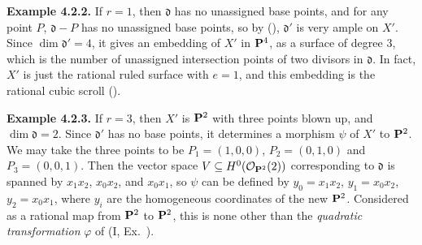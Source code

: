 {\medskip
\noindent\hypertarget{result-V-4.2.2}{}\textbf{Example 4.2.2.} If $r=1$, then $\mathfrak d$ has no unassigned base points, and for any point $P$, $\mathfrak d-P$ has no unassigned base points, so by (), $\mathfrak d'$ is very ample on $X'$. Since $\dim\mathfrak d'=4$, it gives an embedding of $X'$ in $\mathbf{P}^4$, as a surface of degree $3$, which is the number of unassigned intersection points of two divisors in $\mathfrak d$. In fact, $X'$ is just the rational ruled surface with $e=1$, and this embedding is the rational cubic scroll ().

\medskip
\noindent\hypertarget{result-V-4.2.3}{}\textbf{Example 4.2.3.} If $r=3$, then $X'$ is $\mathbf{P}^2$ with three points blown up, and $\dim\mathfrak d=2$. Since $\mathfrak d'$ has no base points, it determines a morphism $\psi$ of $X'$ to $\mathbf{P}^2$. We may take the three points to be $P_1=(1,0,0)$, $P_2=(0,1,0)$ and $P_3=(0,0,1)$. Then the vector space $V\subseteq H^0(\mathcal O_{\mathbf{P}^2}(2))$ corresponding to $\mathfrak d$ is spanned by $x_1x_2$, $x_0x_2$, and $x_0x_1$, so $\psi$ can be defined by $y_0=x_1x_2$, $y_1=x_0x_2$, $y_2=x_0x_1$, where $y_i$ are the homogeneous coordinates of the new $\mathbf{P}^2$. Considered as a rational map from $\mathbf{P}^2$ to $\mathbf{P}^2$, this is none other than the \emph{quadratic transformation} $\varphi$ of (I, Ex.~).
}
